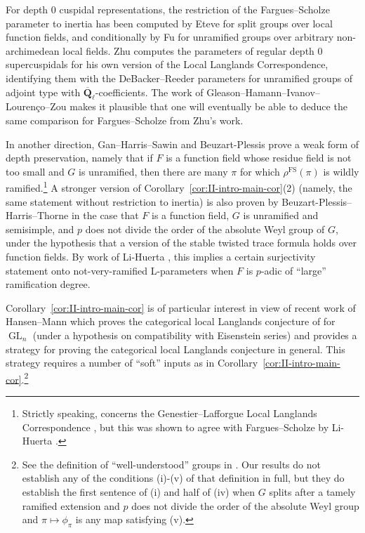 \documentclass[reqno]{amsart}
\numberwithin{equation}{subsection}
\newcommand{\Q}{\mathbf{Q}}
\newcommand{\ol}[1]{\overline{#1}}
\DeclareMathOperator{\GL}{GL}
\DeclareMathOperator{\FS}{FS}
\theoremstyle{remark}
\numberwithin{equation}{subsection}
\numberwithin{figure}{subsection}
\begin{document}
For depth $0$ cuspidal representations, the restriction of the Fargues--Scholze parameter to inertia has been computed by Eteve \cite[Theorem~2.3.9]{Ete23} for split groups over local function fields, and conditionally by Fu \cite[Theorem~1.0.6]{Fu26} for unramified groups over arbitrary non-archimedean local fields. Zhu \cite[\S 5.3.4]{Zhu25} computes the parameters of regular depth $0$ supercuspidals for his own version of the Local Langlands Correspondence, identifying them with the DeBacker--Reeder parameters for unramified groups of adjoint type with $\ol\Q_\ell$-coefficients. The work of Gleason--Hamann--Ivanov--Louren\c{c}o--Zou \cite{GHILZ26} makes it plausible that one will eventually be able to deduce the same comparison for Fargues--Scholze from Zhu's work.

In another direction, Gan--Harris--Sawin and Beuzart-Plessis \cite[Theorem 1.4]{GHS24} prove a weak form of depth preservation, namely that if $F$ is a function field whose residue field is not too small and $G$ is unramified, then there are many $\pi$ for which $\rho^{\FS}(\pi)$ is wildly ramified.\footnote{Strictly speaking, \cite{GHS24} concerns the Genestier--Lafforgue Local Langlands Correspondence \cite{GL18}, but this was shown to agree with Fargues--Scholze by Li-Huerta \cite{LH23}.} A stronger version of Corollary~\ref{cor:II-intro-main-cor}(2) (namely, the same statement without restriction to inertia) is also proven by Beuzart-Plessis--Harris--Thorne \cite{BPHT25} in the case that $F$ is a function field, $G$ is unramified and semisimple, and $p$ does not divide the order of the absolute Weyl group of $G$, under the hypothesis that a version of the stable twisted trace formula holds over function fields. By work of Li-Huerta \cite{LH24}, this implies a certain surjectivity statement onto not-very-ramified L-parameters when $F$ is $p$-adic of ``large'' ramification degree.

Corollary~\ref{cor:II-intro-main-cor} is of particular interest in view of recent work of Hansen--Mann \cite{HM26} which proves the categorical local Langlands conjecture of \cite{FS} for $\GL_n$ (under a hypothesis on compatibility with Eisenstein series) and provides a strategy for proving the categorical local Langlands conjecture in general. This strategy requires a number of ``soft'' inputs as in Corollary~\ref{cor:II-intro-main-cor}.\footnote{See the definition of ``well-understood'' groups in \cite[Definition 6.1.1]{HM26}. Our results do not establish any of the conditions (i)-(v) of that definition in full, but they do establish the first sentence of (i) and half of (iv) when $G$ splits after a tamely ramified extension and $p$ does not divide the order of the absolute Weyl group and $\pi \mapsto \phi_\pi$ is any map satisfying (v).}
\end{document}
